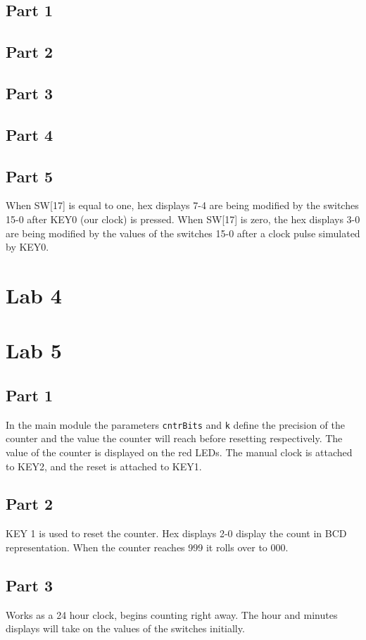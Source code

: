\documentclass[oneside,letterpaper,12pt,titlepage]{article}
\begin{document}
\subsection{Part 1}

\subsection{Part 2}

\subsection{Part 3}

\subsection{Part 4}

\subsection{Part 5}
When SW[17] is equal to one, hex displays 7-4 are being modified by the switches 15-0 after KEY0 (our clock) is pressed. When SW[17] is zero, the hex displays 3-0 are being modified by the values of the switches 15-0 after a clock pulse simulated by KEY0.

\section{Lab 4}

\section{Lab 5}

\subsection{Part 1}
In the main module the parameters \texttt{cntrBits} and \texttt{k} define the precision of the counter and the value the counter will reach before resetting respectively. The value of the counter is displayed on the red LEDs. The manual clock is attached to KEY2, and the reset is attached to KEY1.

\subsection{Part 2}
KEY 1 is used to reset the counter. Hex displays 2-0 display the count in BCD representation. When the counter reaches 999 it rolls over to 000.

\subsection{Part 3}
Works as a 24 hour clock, begins counting right away. The hour and minutes displays will take on the values of the switches initially.
\end{document}

